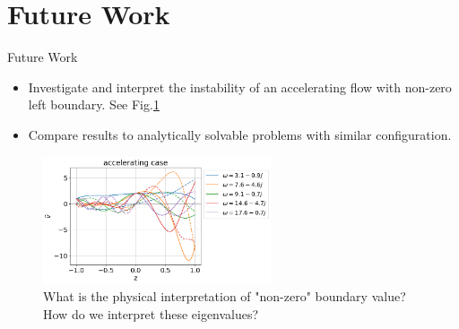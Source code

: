 \section{Future Work}
\begin{frame}{Future Work}
  \begin{itemize}
    \item Investigate and interpret the instability of an accelerating flow with non-zero left boundary. See Fig.\ref{fig:accelerating-v-nonzero-bc}
    \item Compare results to analytically solvable problems with similar configuration.
  \end{itemize}

  \begin{figure}[htbp]
    \centering
    \includegraphics[width=0.6\textwidth]{../../thesis/img/numerical-experiments/accelerating-v-nonzero-bc}
    \caption{What is the physical interpretation of "non-zero" boundary value? How do we interpret these eigenvalues?}
    \label{fig:accelerating-v-nonzero-bc}
  \end{figure}
\end{frame}
